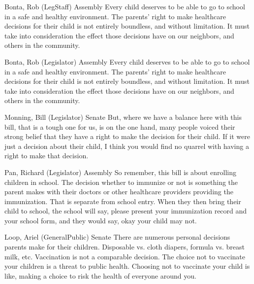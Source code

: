 \begin{result}{22.431415639841582}{Bonta, Rob (LegStaff) Assembly}
Every child deserves to be able to go to school in a safe and healthy environment. The parents' right to make healthcare decisions for their child is not entirely boundless, and without limitation. It must take into consideration the effect those decisions have on our neighbors, and others in the community.
\end{result}

\begin{result}{22.431415639841582}{Bonta, Rob (Legislator) Assembly}
Every child deserves to be able to go to school in a safe and healthy environment. The parents' right to make healthcare decisions for their child is not entirely boundless, and without limitation. It must take into consideration the effect those decisions have on our neighbors, and others in the community.
\end{result}

\begin{result}{20.616309653426804}{Monning, Bill (Legislator) Senate}
But, where we have a balance here with this bill, that is a tough one for us, is on the one hand, many people voiced their strong belief that they have a right to make the decision for their child. If it were just a decision about their child, I think you would find no quarrel with having a right to make that decision.
\end{result}

\begin{result}{15.940706597810152}{Pan, Richard (Legislator) Assembly}
So remember, this bill is about enrolling children in school. The decision whether to immunize or not is something the parent makes with their doctors or other healthcare providers providing the immunization. That is separate from school entry. When they then bring their child to school, the school will say, please present your immunization record and your school form, and they would say, okay your child may not.
\end{result}

\begin{result}{15.605225435122286}{Loop, Ariel (GeneralPublic) Senate}
There are numerous personal decisions parents make for their children. Disposable vs. cloth diapers, formula vs. breast milk, etc. Vaccination is not a comparable decision. The choice not to vaccinate your children is a threat to public health. Choosing not to vaccinate your child is like, making a choice to risk the health of everyone around you.
\end{result}

